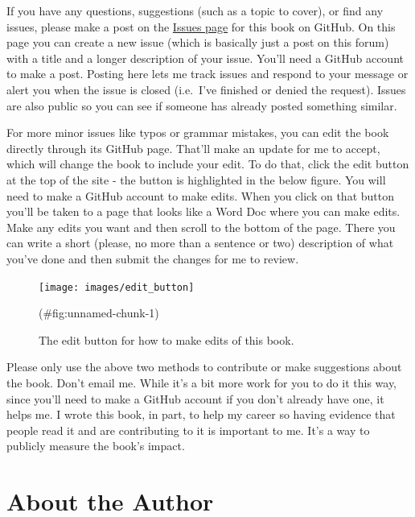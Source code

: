 \documentclass[
  12pt,
  openany]{book}
\begin{document}
If you have any questions, suggestions (such as a topic to cover), or find any issues, please make a post on the \href{https://github.com/jacobkap/ucrbook/issues}{Issues page} for this book on GitHub. On this page you can create a new issue (which is basically just a post on this forum) with a title and a longer description of your issue. You'll need a GitHub account to make a post. Posting here lets me track issues and respond to your message or alert you when the issue is closed (i.e.~I've finished or denied the request). Issues are also public so you can see if someone has already posted something similar.

For more minor issues like typos or grammar mistakes, you can edit the book directly through its GitHub page. That'll make an update for me to accept, which will change the book to include your edit. To do that, click the edit button at the top of the site - the button is highlighted in the below figure. You will need to make a GitHub account to make edits. When you click on that button you'll be taken to a page that looks like a Word Doc where you can make edits. Make any edits you want and then scroll to the bottom of the page. There you can write a short (please, no more than a sentence or two) description of what you've done and then submit the changes for me to review.

\begin{figure}

{\centering \texttt{[image: images/edit\_button]} 

}

\caption{The edit button for how to make edits of this book.}(\#fig:unnamed-chunk-1)
\end{figure}

Please only use the above two methods to contribute or make suggestions about the book. Don't email me. While it's a bit more work for you to do it this way, since you'll need to make a GitHub account if you don't already have one, it helps me. I wrote this book, in part, to help my career so having evidence that people read it and are contributing to it is important to me. It's a way to publicly measure the book's impact.

\hypertarget{about-the-author}{%
\chapter*{About the Author}\label{about-the-author}}
\end{document}
